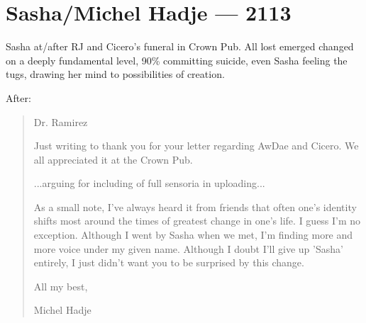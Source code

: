 \chapter*{Sasha/Michel Hadje — 2113}

Sasha at/after RJ and Cicero's funeral in Crown Pub. All lost emerged changed on a deeply fundamental level, 90\% committing suicide, even Sasha feeling the tugs, drawing her mind to possibilities of creation.

After:

\begin{quote}
  Dr. Ramirez

  Just writing to thank you for your letter regarding AwDae and Cicero. We all appreciated it at the Crown Pub.

  ...arguing for including of full sensoria in uploading...

  As a small note, I've always heard it from friends that often one's identity shifts most around the times of greatest change in one's life. I guess I'm no exception. Although I went by Sasha when we met, I'm finding more and more voice under my given name. Although I doubt I'll give up 'Sasha' entirely, I just didn't want you to be surprised by this change.

  All my best,

  Michel Hadje
\end{quote}
